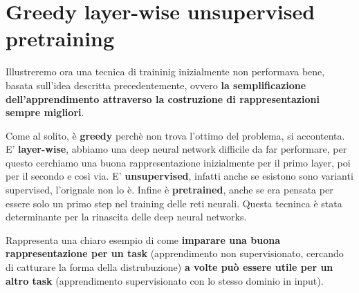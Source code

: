 \section{Greedy layer-wise unsupervised pretraining}
Illustreremo ora una tecnica di traininig inizialmente non performava bene, basata sull'idea descritta
precedentemente, ovvero \textbf{la semplificazione dell'apprendimento attraverso la costruzione di
rappresentazioni sempre migliori}.


Come al solito, è \textbf{greedy} perchè non trova l'ottimo del problema, si accontenta.
E' \textbf{layer-wise}, abbiamo una deep neural network difficile da far performare, per questo 
cerchiamo una buona rappresentazione inizialmente per il primo layer, poi per il secondo e così via.
E' \textbf{unsupervised}, infatti anche se esistono sono varianti supervised, l'orignale non lo è.
Infine è \textbf{pretrained}, anche se era pensata per essere solo un primo step nel training delle 
reti neurali. Questa tecninca è stata determinante per la rinascita delle deep neural networks.


Rappresenta una chiaro esempio di come \textbf{imparare una buona rappresentazione per un task} (apprendimento
non supervisionato, cercando di catturare la forma della distrubuzione) \textbf{a volte può essere utile per 
un altro task} (apprendimento supervisionato con lo stesso dominio in input).

